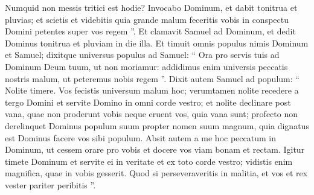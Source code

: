 \begin{biblechapter}
\begin{biblechapter}
\begin{biblechapter}
\begin{biblechapter}
\begin{biblechapter}
\begin{biblechapter}
\begin{biblechapter}
\begin{biblechapter}
\begin{biblechapter}
\begin{biblechapter}
\begin{biblechapter}
\begin{biblechapter}
\verse Numquid non messis tritici est hodie? Invocabo Dominum, et dabit tonitrua et pluvias; et scietis et videbitis quia grande malum feceritis vobis in conspectu Domini petentes super vos regem ”.
 \verse Et clamavit Samuel ad Dominum, et dedit Dominus tonitrua et pluviam in die illa. 
\verse Et timuit omnis populus nimis Dominum et Samuel; dixitque universus populus ad Samuel: “ Ora pro servis tuis ad Dominum Deum tuum, ut non moriamur: addidimus enim universis peccatis nostris malum, ut peteremus nobis regem ”.
 \verse Dixit autem Samuel ad populum: “ Nolite timere. Vos fecistis universum malum hoc; verumtamen nolite recedere a tergo Domini et servite Domino in omni corde vestro; 
\verse et nolite declinare post vana, quae non proderunt vobis neque eruent vos, quia vana sunt; 
\verse profecto non derelinquet Dominus populum suum propter nomen suum magnum, quia dignatus est Dominus facere vos sibi populum. 
 \verse Absit autem a me hoc peccatum in Dominum, ut cessem orare pro vobis et docere vos viam bonam et rectam. 
\verse Igitur timete Dominum et servite ei in veritate et ex toto corde vestro; vidistis enim magnifica, quae in vobis gesserit. 
\verse Quod si perseveraveritis in malitia, et vos et rex vester pariter peribitis ”.
 

\end{biblechapter}
\end{biblechapter}
\end{biblechapter}
\end{biblechapter}
\end{biblechapter}
\end{biblechapter}
\end{biblechapter}
\end{biblechapter}
\end{biblechapter}
\end{biblechapter}
\end{biblechapter}
\end{biblechapter}
